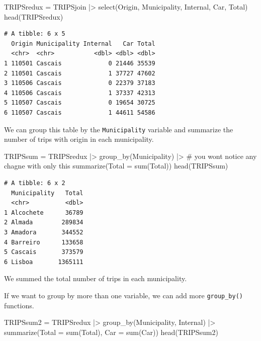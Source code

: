 \documentclass[
  letterpaper,
  DIV=11,
  numbers=noendperiod]{scrreprt}
\newenvironment{Shaded}{\begin{snugshade}}{\end{snugshade}}
\newcommand{\AttributeTok}[1]{\textcolor[rgb]{0.40,0.45,0.13}{#1}}
\newcommand{\CommentTok}[1]{\textcolor[rgb]{0.37,0.37,0.37}{#1}}
\newcommand{\FunctionTok}[1]{\textcolor[rgb]{0.28,0.35,0.67}{#1}}
\newcommand{\NormalTok}[1]{\textcolor[rgb]{0.00,0.23,0.31}{#1}}
\newcommand{\OtherTok}[1]{\textcolor[rgb]{0.00,0.23,0.31}{#1}}
\newcommand{\SpecialCharTok}[1]{\textcolor[rgb]{0.37,0.37,0.37}{#1}}
\begin{document}
\begin{Shaded}
\begin{Highlighting}[]
\NormalTok{TRIPSredux }\OtherTok{=}\NormalTok{ TRIPSjoin }\SpecialCharTok{|\textgreater{}} \FunctionTok{select}\NormalTok{(Origin, Municipality, Internal, Car, Total)}
\FunctionTok{head}\NormalTok{(TRIPSredux)}
\end{Highlighting}
\end{Shaded}

\begin{verbatim}
# A tibble: 6 x 5
  Origin Municipality Internal   Car Total
  <chr>  <chr>           <dbl> <dbl> <dbl>
1 110501 Cascais             0 21446 35539
2 110501 Cascais             1 37727 47602
3 110506 Cascais             0 22379 37183
4 110506 Cascais             1 37337 42313
5 110507 Cascais             0 19654 30725
6 110507 Cascais             1 44611 54586
\end{verbatim}

We can group this table by the \texttt{Municipality} variable and
summarize the number of trips with origin in each municipality.

\begin{Shaded}
\begin{Highlighting}[]
\NormalTok{TRIPSsum }\OtherTok{=}\NormalTok{ TRIPSredux }\SpecialCharTok{|\textgreater{}} 
  \FunctionTok{group\_by}\NormalTok{(Municipality) }\SpecialCharTok{|\textgreater{}} \CommentTok{\# you won\textquotesingle{}t notice any chagne with only this}
  \FunctionTok{summarize}\NormalTok{(}\AttributeTok{Total =} \FunctionTok{sum}\NormalTok{(Total))}
\FunctionTok{head}\NormalTok{(TRIPSsum)}
\end{Highlighting}
\end{Shaded}

\begin{verbatim}
# A tibble: 6 x 2
  Municipality   Total
  <chr>          <dbl>
1 Alcochete      36789
2 Almada        289834
3 Amadora       344552
4 Barreiro      133658
5 Cascais       373579
6 Lisboa       1365111
\end{verbatim}

We summed the total number of trips in each municipality.

If we want to group by more than one variable, we can add more
\texttt{group\_by()} functions.

\begin{Shaded}
\begin{Highlighting}[]
\NormalTok{TRIPSsum2 }\OtherTok{=}\NormalTok{ TRIPSredux }\SpecialCharTok{|\textgreater{}} 
  \FunctionTok{group\_by}\NormalTok{(Municipality, Internal) }\SpecialCharTok{|\textgreater{}} 
  \FunctionTok{summarize}\NormalTok{(}\AttributeTok{Total =} \FunctionTok{sum}\NormalTok{(Total),}
            \AttributeTok{Car =} \FunctionTok{sum}\NormalTok{(Car))}
\FunctionTok{head}\NormalTok{(TRIPSsum2)}
\end{Highlighting}
\end{Shaded}
\end{document}
